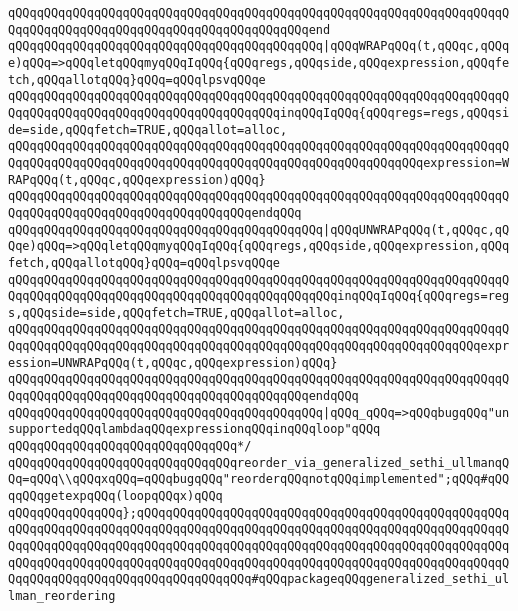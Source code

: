 \verb|qQQqqQQqqQQqqQQqqQQqqQQqqQQqqQQqqQQqqQQqqQQqqQQqqQQqqQQqqQQqqQQqqQQqqQQqqQQqqQQqqQQqqQQqqQQqqQQqqQQqqQQqqQQqqQQqend|\newline
\verb|qQQqqQQqqQQqqQQqqQQqqQQqqQQqqQQqqQQqqQQqqQQq|\verb#|qQQqWRAPqQQq(t,qQQqc,qQQqe)qQQq=>qQQqletqQQqmyqQQqIqQQq{qQQqregs,qQQqside,qQQqexpression,qQQqfetch,qQQqallotqQQq}qQQq=qQQqlpsvqQQqe#\newline
\verb|qQQqqQQqqQQqqQQqqQQqqQQqqQQqqQQqqQQqqQQqqQQqqQQqqQQqqQQqqQQqqQQqqQQqqQQqqQQqqQQqqQQqqQQqqQQqqQQqqQQqqQQqqQQqinqQQqIqQQq{qQQqregs=regs,qQQqside=side,qQQqfetch=TRUE,qQQqallot=alloc,|\newline
\verb|qQQqqQQqqQQqqQQqqQQqqQQqqQQqqQQqqQQqqQQqqQQqqQQqqQQqqQQqqQQqqQQqqQQqqQQqqQQqqQQqqQQqqQQqqQQqqQQqqQQqqQQqqQQqqQQqqQQqqQQqqQQqqQQqexpression=WRAPqQQq(t,qQQqc,qQQqexpression)qQQq}|\newline
\verb|qQQqqQQqqQQqqQQqqQQqqQQqqQQqqQQqqQQqqQQqqQQqqQQqqQQqqQQqqQQqqQQqqQQqqQQqqQQqqQQqqQQqqQQqqQQqqQQqqQQqqQQqendqQQq|\newline
\verb|qQQqqQQqqQQqqQQqqQQqqQQqqQQqqQQqqQQqqQQqqQQq|\verb#|qQQqUNWRAPqQQq(t,qQQqc,qQQqe)qQQq=>qQQqletqQQqmyqQQqIqQQq{qQQqregs,qQQqside,qQQqexpression,qQQqfetch,qQQqallotqQQq}qQQq=qQQqlpsvqQQqe#\newline
\verb|qQQqqQQqqQQqqQQqqQQqqQQqqQQqqQQqqQQqqQQqqQQqqQQqqQQqqQQqqQQqqQQqqQQqqQQqqQQqqQQqqQQqqQQqqQQqqQQqqQQqqQQqqQQqqQQqqQQqinqQQqIqQQq{qQQqregs=regs,qQQqside=side,qQQqfetch=TRUE,qQQqallot=alloc,|\newline
\verb|qQQqqQQqqQQqqQQqqQQqqQQqqQQqqQQqqQQqqQQqqQQqqQQqqQQqqQQqqQQqqQQqqQQqqQQqqQQqqQQqqQQqqQQqqQQqqQQqqQQqqQQqqQQqqQQqqQQqqQQqqQQqqQQqqQQqqQQqexpression=UNWRAPqQQq(t,qQQqc,qQQqexpression)qQQq}|\newline
\verb|qQQqqQQqqQQqqQQqqQQqqQQqqQQqqQQqqQQqqQQqqQQqqQQqqQQqqQQqqQQqqQQqqQQqqQQqqQQqqQQqqQQqqQQqqQQqqQQqqQQqqQQqqQQqqQQqendqQQq|\newline
\verb|qQQqqQQqqQQqqQQqqQQqqQQqqQQqqQQqqQQqqQQqqQQq|\verb#|qQQq_qQQq=>qQQqbugqQQq"unsupportedqQQqlambdaqQQqexpressionqQQqinqQQqloop"qQQq#\newline
\newline
\verb|qQQqqQQqqQQqqQQqqQQqqQQqqQQqqQQq*/|\newline
\verb|qQQqqQQqqQQqqQQqqQQqqQQqqQQqqQQqreorder_via_generalized_sethi_ullmanqQQq=qQQq\\qQQqxqQQq=qQQqbugqQQq"reorderqQQqnotqQQqimplemented";qQQq#qQQqqQQqgetexpqQQq(loopqQQqx)qQQq|\newline
\newline
\verb|qQQqqQQqqQQqqQQq};qQQqqQQqqQQqqQQqqQQqqQQqqQQqqQQqqQQqqQQqqQQqqQQqqQQqqQQqqQQqqQQqqQQqqQQqqQQqqQQqqQQqqQQqqQQqqQQqqQQqqQQqqQQqqQQqqQQqqQQqqQQqqQQqqQQqqQQqqQQqqQQqqQQqqQQqqQQqqQQqqQQqqQQqqQQqqQQqqQQqqQQqqQQqqQQqqQQqqQQqqQQqqQQqqQQqqQQqqQQqqQQqqQQqqQQqqQQqqQQqqQQqqQQqqQQqqQQqqQQqqQQqqQQqqQQqqQQqqQQqqQQqqQQqqQQqqQQq#qQQqpackageqQQqgeneralized_sethi_ullman_reordering|\newline

